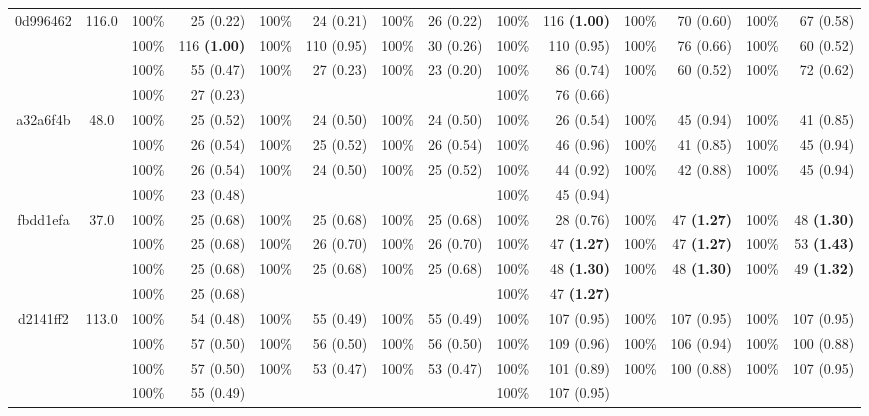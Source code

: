 \begin{adjustbox}{width=1\linewidth}
{\begin{tabular}{c c | cr  cr  cr || cr  cr  cr}
        0d996462  &  116.0     &  100\%  & 25 (0.22)   &  100\%  & 24 (0.21)   &  100\%  & 26 (0.22)    &  100\%  & 116 \textbf{(1.00)}    &  100\%  & 70 (0.60)   &  100\%  & 67 (0.58)  \\ &    &  100\%  & 116 \textbf{(1.00)}    &  100\%  & 110 (0.95)   &  100\%  & 30 (0.26)    &  100\%  & 110 (0.95)   &  100\%  & 76 (0.66)   &  100\%  & 60 (0.52)  \\ &    &  100\%  & 55 (0.47)   &  100\%  & 27 (0.23)   &  100\%  & 23 (0.20)    &  100\%  & 86 (0.74)   &  100\%  & 60 (0.52)   &  100\%  & 72 (0.62)  \\ &    &  100\%  & 27 (0.23)    &   &   &   &   &   100\%  & 76 (0.66)  \\
        \hline
 a32a6f4b  &  48.0   &   100\%  & 25 (0.52)   &  100\%  & 24 (0.50)   &  100\%  & 24 (0.50)    &  100\%  & 26 (0.54)   &  100\%  & 45 (0.94)   &  100\%  & 41 (0.85)  \\ &    &  100\%  & 26 (0.54)   &  100\%  & 25 (0.52)   &  100\%  & 26 (0.54)    &  100\%  & 46 (0.96)   &  100\%  & 41 (0.85)   &  100\%  & 45 (0.94)  \\ &    &  100\%  & 26 (0.54)   &  100\%  & 24 (0.50)   &  100\%  & 25 (0.52)    &  100\%  & 44 (0.92)   &  100\%  & 42 (0.88)   &  100\%  & 45 (0.94)  \\ &    &  100\%  & 23 (0.48)    &   &  &  &  &  100\%  & 45 (0.94)  \\
        \hline
 fbdd1efa  &  37.0     &  100\%  & 25 (0.68)   &  100\%  & 25 (0.68)   &  100\%  & 25 (0.68)    &  100\%  & 28 (0.76)   &  100\%  & 47 \textbf{(1.27)}    &  100\%  & 48 \textbf{(1.30)}   \\ &    &  100\%  & 25 (0.68)   &  100\%  & 26 (0.70)   &  100\%  & 26 (0.70)    &  100\%  & 47 \textbf{(1.27)}    &  100\%  & 47 \textbf{(1.27)}    &  100\%  & 53 \textbf{(1.43)}   \\ &    &  100\%  & 25 (0.68)   &  100\%  & 25 (0.68)   &  100\%  & 25 (0.68)    &  100\%  & 48 \textbf{(1.30)}    &  100\%  & 48 \textbf{(1.30)}    &  100\%  & 49 \textbf{(1.32)}   \\ &    &  100\%  & 25 (0.68)     &   &  &  &   &  100\%  & 47 \textbf{(1.27)}   \\
        \hline
   d2141ff2  &  113.0    &  100\%  & 54 (0.48)   &  100\%  & 55 (0.49)   &  100\%  & 55 (0.49)    &  100\%  & 107 (0.95)   &  100\%  & 107 (0.95)   &  100\%  & 107 (0.95)  \\ &    &  100\%  & 57 (0.50)   &  100\%  & 56 (0.50)   &  100\%  & 56 (0.50)    &  100\%  & 109 (0.96)   &  100\%  & 106 (0.94)   &  100\%  & 100 (0.88)  \\ &    &  100\%  & 57 (0.50)   &  100\%  & 53 (0.47)   &  100\%  & 53 (0.47)    &  100\%  & 101 (0.89)   &  100\%  & 100 (0.88)   &  100\%  & 107 (0.95)  \\ &    &  100\%  & 55 (0.49)     &   &  &  &   &  100\%  & 107 (0.95)  \\

\end{tabular}}
\end{adjustbox}
